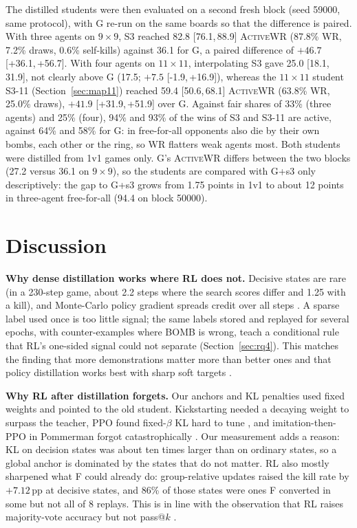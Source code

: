\documentclass[11pt]{article}
\newcommand{\awr}{\textsc{ActiveWR}}
\newcommand{\pp}{\,pp}
\newcommand{\ci}[2]{[#1,\,#2]}
\begin{document}
The distilled students were then evaluated on a second fresh block (seed 59000, same protocol), with G re-run on the same boards so that the difference is paired. With three agents on $9\times9$, S3 reached 82.8 \ci{76.1}{88.9} \awr{} (87.8\% WR, 7.2\% draws, 0.6\% self-kills) against 36.1 for G, a paired difference of $+46.7$ \ci{+36.1}{+56.7}. With four agents on $11\times11$, interpolating S3 gave 25.0 \ci{18.1}{31.9}, not clearly above G (17.5; $+7.5$ \ci{-1.9}{+16.9}), whereas the $11\times11$ student S3-11 (Section~\ref{sec:map11}) reached 59.4 \ci{50.6}{68.1} \awr{} (63.8\% WR, 25.0\% draws), $+41.9$ \ci{+31.9}{+51.9} over G. Against fair shares of 33\% (three agents) and 25\% (four), 94\% and 93\% of the wins of S3 and S3-11 are active, against 64\% and 58\% for G: in free-for-all opponents also die by their own bombs, each other or the ring, so WR flatters weak agents most. Both students were distilled from 1v1 games only. G's \awr{} differs between the two blocks (27.2 versus 36.1 on $9\times9$), so the students are compared with G+s3 only descriptively: the gap to G+s3 grows from 1.75 points in 1v1 to about 12 points in three-agent free-for-all (94.4 on block 50000).

\section{Discussion}

\textbf{Why dense distillation works where RL does not.} Decisive states are rare (in a 230-step game, about 2.2 steps where the search scores differ and 1.25 with a kill), and Monte-Carlo policy gradient spreads credit over all steps \cite{williams1992reinforce}. A sparse label used once is too little signal; the same labels stored and replayed for several epochs, with counter-examples where BOMB is wrong, teach a conditional rule that RL's one-sided signal could not separate (Section~\ref{sec:rq4}). This matches the finding that more demonstrations matter more than better ones \cite{kartal2019safer} and that policy distillation works best with sharp soft targets \cite{rusu2016distill}.

\textbf{Why RL after distillation forgets.} Our anchors and KL penalties used fixed weights and pointed to the old student. Kickstarting \cite{schmitt2018kickstart} needed a decaying weight to surpass the teacher, PPO found fixed-$\beta$ KL hard to tune \cite{schulman2017ppo}, and imitation-then-PPO in Pommerman forgot catastrophically \cite{meisheri2019}. Our measurement adds a reason: KL on decision states was about ten times larger than on ordinary states, so a global anchor is dominated by the states that do not matter. RL also mostly sharpened what F could already do: group-relative updates raised the kill rate by $+7.12$\pp{} at decisive states, and 86\% of those states were ones F converted in some but not all of 8 replays. This is in line with the observation that RL raises majority-vote accuracy but not pass@$k$ \cite{shao2024grpo}.
\end{document}
